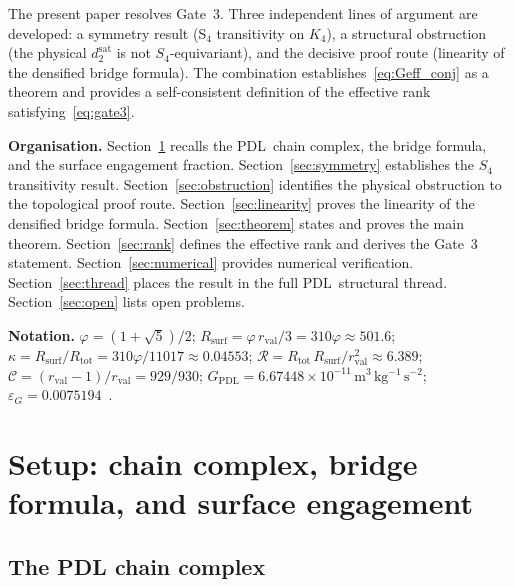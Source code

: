 \documentclass[11pt,a4paper]{article}
\theoremstyle{definition}
\newcommand{\PDL}{\textnormal{PDL}}
\newcommand{\Rsurf}{R_{\mathrm{surf}}}
\newcommand{\Rtot}{R_{\mathrm{tot}}}
\newcommand{\rval}{r_{\mathrm{val}}}
\newcommand{\epsg}{\varepsilon_G}
\newcommand{\Kfour}{K_4}
\newcommand{\vp}{\varphi}
\newcommand{\kap}{\kappa}
\newcommand{\calC}{\mathcal{C}}
\newcommand{\calR}{\mathcal{R}}
\newcommand{\GPDL}{G_{\mathrm{PDL}}}
\newcommand{\dmap}{d_2}
\begin{document}
The present paper resolves Gate~3. Three independent lines of argument are developed: a symmetry result (S$_4$ transitivity on $\Kfour$), a structural obstruction (the physical $\dmap^{\mathrm{sat}}$ is not $S_4$-equivariant), and the decisive proof route (linearity of the densified bridge formula). The combination establishes~\eqref{eq:Geff_conj} as a theorem and provides a self-consistent definition of the effective rank satisfying~\eqref{eq:gate3}.

\medskip\noindent\textbf{Organisation.} Section~\ref{sec:setup} recalls the \PDL\ chain complex, the bridge formula, and the surface engagement fraction. Section~\ref{sec:symmetry} establishes the $S_4$ transitivity result. Section~\ref{sec:obstruction} identifies the physical obstruction to the topological proof route. Section~\ref{sec:linearity} proves the linearity of the densified bridge formula. Section~\ref{sec:theorem} states and proves the main theorem. Section~\ref{sec:rank} defines the effective rank and derives the Gate~3 statement. Section~\ref{sec:numerical} provides numerical verification. Section~\ref{sec:thread} places the result in the full \PDL\ structural thread. Section~\ref{sec:open} lists open problems.

\medskip\noindent\textbf{Notation.} $\vp = (1+\sqrt{5})/2$; $\Rsurf = \vp\,\rval/3 = 310\vp \approx 501.6$; $\kap = \Rsurf/\Rtot = 310\vp/11017 \approx 0.04553$; $\calR = \Rtot\,\Rsurf/\rval^2 \approx 6.389$; $\calC = (\rval-1)/\rval = 929/930$; $\GPDL = 6.67448\times10^{-11}\,\mathrm{m^3\,kg^{-1}\,s^{-2}}$; $\epsg = 0.0075194$~\cite{Bridge_PDL_2026}.

\section{Setup: chain complex, bridge formula, and surface engagement}
\label{sec:setup}

\subsection{The PDL chain complex}
\label{subsec:chain}
\end{document}
